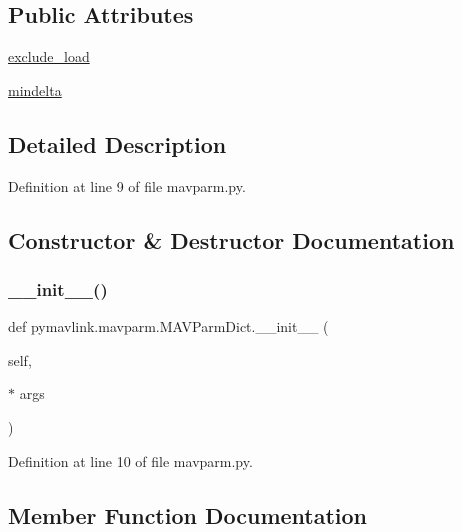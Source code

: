 \subsection*{Public Attributes}
\begin{DoxyCompactItemize}
\item 
\mbox{\hyperlink{classpymavlink_1_1mavparm_1_1MAVParmDict_a50e24dfc2d1005d14f1a2aeaf973b81f}{exclude\+\_\+load}}
\item 
\mbox{\hyperlink{classpymavlink_1_1mavparm_1_1MAVParmDict_a4b88b42a8f98ed67c5a95dd9aa75597e}{mindelta}}
\end{DoxyCompactItemize}


\subsection{Detailed Description}


Definition at line 9 of file mavparm.\+py.



\subsection{Constructor \& Destructor Documentation}
\mbox{\label{classpymavlink_1_1mavparm_1_1MAVParmDict_ad57039a57c457830445589005aa8bc98}} 
\subsubsection{\texorpdfstring{\_\_init\_\_()}{\_\_init\_\_()}}
{\footnotesize\ttfamily def pymavlink.\+mavparm.\+M\+A\+V\+Parm\+Dict.\+\_\+\+\_\+init\+\_\+\+\_\+ (\begin{DoxyParamCaption}\item[{}]{self,  }\item[{$\ast$}]{args }\end{DoxyParamCaption})}



Definition at line 10 of file mavparm.\+py.



\subsection{Member Function Documentation}
\mbox{\label{classpymavlink_1_1mavparm_1_1MAVParmDict_a61470ddc60a053270b7cc6ed8639f7c8}} 
